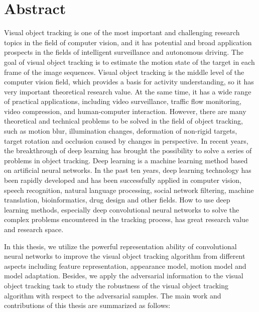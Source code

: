\intobmk\chapter*{Abstract}%

Visual object tracking is one of the most important and challenging research topics in the field of computer vision, and it has potential and broad application prospects in the fields of intelligent surveillance and autonomous driving. The goal of visual object tracking is to estimate the motion state of the target in each frame of the image sequences. Visual object tracking is the middle level of the computer vision field, which provides a basis for activity understanding, so it has very important theoretical research value. At the same time, it has a wide range of practical applications, including video surveillance, traffic flow monitoring, video compression, and human-computer interaction.
However, there are many theoretical and technical problems to be solved in the field of object tracking, such as motion blur, illumination changes, deformation of non-rigid targets, target rotation and occlusion caused by changes in perspective. In recent years, the breakthrough of deep learning has brought the possibility to solve a series of problems in object tracking.
Deep learning is a machine learning method based on artificial neural networks. In the past ten years, deep learning technology has been rapidly developed and has been successfully applied in computer vision, speech recognition, natural language processing, social network filtering, machine translation, bioinformatics, drug design and other fields. How to use deep learning methods, especially deep convolutional neural networks to solve the complex problems encountered in the tracking process, has great research value and research space.

In this thesis, we utilize the powerful representation ability of convolutional neural networks to improve the visual object tracking algorithm from different aspects including feature representation, appearance model, motion model and model adaptation. Besides, we apply the adversarial information to the visual object tracking task to study the robustness of the visual object tracking algorithm with respect to the adversarial samples. The main work and contributions of this thesis are summarized as follows:

